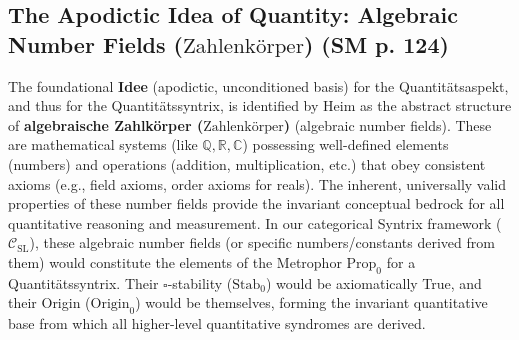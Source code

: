 \documentclass[
    12pt,              %
    a4paper,           %
    headings=normal,   %
    twoside=true,      %
    BCOR=8mm,          %
]{scrbook}
\newcommand{\zahlenkoerper}{\text{Zahlenkörper}}
\newcommand{\BoxSyn}{\square}
\begin{document}
\subsection{The Apodictic Idea of Quantity: Algebraic Number Fields (\(\zahlenkoerper\)) (SM p. 124)}
\label{sec:ch7_2_1_apodikt_idea_quantity}
The foundational \textbf{Idee} (apodictic, unconditioned basis) for the Quantitätsaspekt, and thus for the Quantitätssyntrix, is identified by Heim as the abstract structure of \textbf{algebraische Zahlkörper (\(\zahlenkoerper\))} (algebraic number fields). These are mathematical systems (like \(\mathbb{Q}, \mathbb{R}, \mathbb{C}\)) possessing well-defined elements (numbers) and operations (addition, multiplication, etc.) that obey consistent axioms (e.g., field axioms, order axioms for reals). The inherent, universally valid properties of these number fields provide the invariant conceptual bedrock for all quantitative reasoning and measurement.
In our categorical Syntrix framework (\(\mathcal{C}_{\text{SL}}\)), these algebraic number fields (or specific numbers/constants derived from them) would constitute the elements of the Metrophor \(\text{Prop}_0\) for a Quantitätssyntrix. Their \( \BoxSyn \)-stability (\(\text{Stab}_0\)) would be axiomatically True, and their Origin (\(\text{Origin}_0\)) would be themselves, forming the invariant quantitative base from which all higher-level quantitative syndromes are derived.
\end{document}

